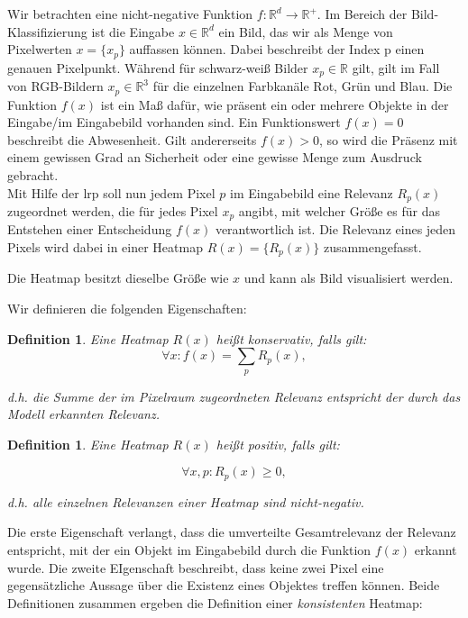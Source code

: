 \documentclass[11pt,a4paper]{article}
\def\emph#1{\textit{#1}}
\newtheorem{definition}[theorem]{Definition}
\numberwithin{equation}{section}
\begin{document}
	Wir betrachten eine nicht-negative Funktion $f: \mathbb{R}^d \to \mathbb{R}^{+}$. Im Bereich der Bild-Klassifizierung ist die Eingabe $x \in \mathbb{R}^d$ ein Bild, das wir als Menge von Pixelwerten $x=\lbrace x_p \rbrace$ auffassen können. Dabei beschreibt der Index p einen genauen Pixelpunkt. Während für schwarz-weiß Bilder $x_p \in \mathbb{R}$ gilt, gilt im Fall von RGB-Bildern $x_p \in \mathbb{R}^3$ für die einzelnen Farbkanäle Rot, Grün und Blau. Die Funktion $f(x)$ ist ein Maß dafür, wie präsent ein oder mehrere Objekte in der Eingabe/im Eingabebild vorhanden sind. Ein Funktionswert $f(x)=0$ beschreibt die Abwesenheit. Gilt andererseits $f(x) >0$, so wird die Präsenz mit einem gewissen Grad an Sicherheit oder eine gewisse Menge zum Ausdruck gebracht.\\
	
	Mit Hilfe der \gls{lrp} soll nun jedem Pixel $p$ im Eingabebild eine Relevanz $R_p(x)$ zugeordnet werden, die für jedes Pixel $x_p$ angibt, mit welcher Größe es für das Entstehen einer Entscheidung $f(x)$ verantwortlich ist. Die Relevanz eines jeden Pixels wird dabei in einer Heatmap $R(x) = \lbrace R_p(x) \rbrace$ zusammengefasst.
	
	Die Heatmap besitzt dieselbe Größe wie $x$ und kann als Bild visualisiert werden.
	
	Wir definieren die folgenden Eigenschaften:
	
	\begin{definition}\label{def_konservativ}
		Eine Heatmap $R(x)$ heißt \emph{konservativ}, falls gilt:
		\begin{equation}
		\forall x: f(x) = \sum_p R_p(x),
		\end{equation}
		
		d.h. die Summe der im Pixelraum zugeordneten Relevanz entspricht der durch das Modell erkannten Relevanz.
	\end{definition}
	
	
	\begin{definition} \label{def_pos}
		Eine Heatmap $R(x)$ heißt \emph{positiv}, falls gilt:
		
		\begin{equation}
		\forall x,p: R_p(x) \geq 0,
		\end{equation}
		
		d.h. alle einzelnen Relevanzen einer Heatmap sind nicht-negativ.
		
	\end{definition}
	
	Die erste Eigenschaft verlangt, dass die umverteilte Gesamtrelevanz der Relevanz entspricht, mit der ein Objekt im Eingabebild durch die Funktion $f(x)$ erkannt wurde.
	Die zweite EIgenschaft beschreibt, dass keine zwei Pixel eine gegensätzliche Aussage über die Existenz eines Objektes treffen können. Beide Definitionen zusammen ergeben die Definition einer \textit{konsistenten} Heatmap:
	
\end{document}

